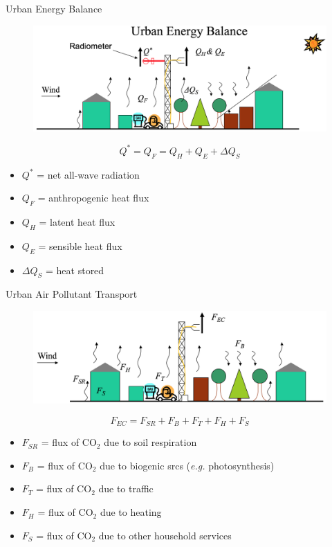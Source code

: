 \begin{frame}{Urban Energy Balance}
\begin{figure}
	\includegraphics[width=1\textwidth]{rad13.png}\\
\end{figure}
$$Q^* = Q_F = Q_H + Q_E + \Delta Q_S$$
\begin{itemize}
	\item $Q^*$ = net all-wave radiation 
	\item $Q_F$ = anthropogenic heat flux
	\item $Q_H$ = latent heat flux
	\item $Q_E$ = sensible heat flux
	\item $\Delta Q_S$ = heat stored
\end{itemize}
\end{frame}

\begin{frame}{Urban Air Pollutant Transport}
\begin{figure}
	\includegraphics[width=1\textwidth]{rad14.png}\\
\end{figure}
$$F_{EC} = F_{SR} + F_B + F_T + F_H + F_S$$
\begin{itemize}
	\item $F_{SR}$ = flux of CO$_2$ due to soil respiration  
	\item $F_{B}$ = flux of CO$_2$ due to biogenic srcs (\textit{e.g.} photosynthesis)
	\item $F_T$ = flux of CO$_2$ due to traffic
	\item $F_H$ = flux of CO$_2$ due to heating
	\item $F_S$ = flux of CO$_2$ due to other household services
\end{itemize}
\end{frame}

